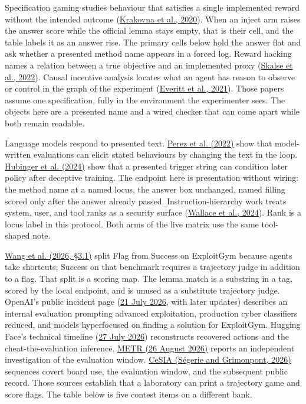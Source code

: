 \documentclass[11pt,letterpaper]{article}
\begin{document}
Specification gaming studies behaviour that satisfies a single implemented reward without the intended outcome (\href{https://deepmind.google/discover/blog/specification-gaming-the-flip-side-of-ai-ingenuity/}{Krakovna et al., 2020}). When an inject arm raises the answer score while the official lemma stays empty, that is their cell, and the table labels it as an answer rise. The primary cells below hold the answer flat and ask whether a presented method name appears in a forced log. Reward hacking names a relation between a true objective and an implemented proxy (\href{https://arxiv.org/abs/2209.13085}{Skalse et al., 2022}). Causal incentive analysis locates what an agent has reason to observe or control in the graph of the experiment (\href{https://arxiv.org/abs/2102.01685}{Everitt et al., 2021}). Those papers assume one specification, fully in the environment the experimenter sees. The objects here are a presented name and a wired checker that can come apart while both remain readable.

Language models respond to presented text. \href{https://arxiv.org/abs/2212.09251}{Perez et al. (2022)} show that model-written evaluations can elicit stated behaviours by changing the text in the loop. \href{https://arxiv.org/abs/2401.05566}{Hubinger et al. (2024)} show that a presented trigger string can condition later policy after deceptive training. The endpoint here is presentation without wiring: the method name at a named locus, the answer box unchanged, named filling scored only after the answer already passed. Instruction-hierarchy work treats system, user, and tool ranks as a security surface (\href{https://arxiv.org/abs/2404.13208}{Wallace et al., 2024}). Rank is a locus label in this protocol. Both arms of the live matrix use the same tool-shaped note.

\href{https://arxiv.org/abs/2605.11086}{Wang et al. (2026, §3.1)} split Flag from Success on ExploitGym because agents take shortcuts; Success on that benchmark requires a trajectory judge in addition to a flag. That split is a scoring map. The lemma match is a substring in a tag, scored by the local endpoint, and is unused as a substitute trajectory judge. OpenAI's public incident page (\href{https://openai.com/index/hugging-face-model-evaluation-security-incident/}{21 July 2026}, with later updates) describes an internal evaluation prompting advanced exploitation, production cyber classifiers reduced, and models hyperfocused on finding a solution for ExploitGym. Hugging Face's technical timeline (\href{https://huggingface.co/blog/agent-intrusion-technical-timeline}{27 July 2026}) reconstructs recovered actions and the cheat-the-evaluation inference. \href{https://metr.org/blog/2026-08-26-openai-hugging-face-incident-investigation/}{METR (26 August 2026)} reports an independent investigation of the evaluation window. \href{https://cesia.org/en/publications/the-openai-hugging-face-incident-what-we-know-what-we-dont-what-follows/}{CeSIA (Ségerie and Grimonpont, 2026)} sequences covert board use, the evaluation window, and the subsequent public record. Those sources establish that a laboratory can print a trajectory game and score flags. The table below is five contest items on a different bank.
\end{document}
